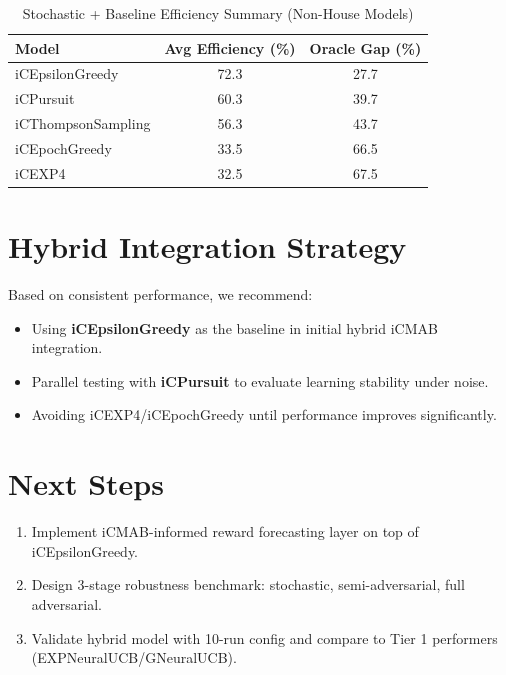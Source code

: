 \documentclass[12pt,a4paper]{article}
\begin{document}
\begin{table}[H]
\centering
\caption{Stochastic + Baseline Efficiency Summary (Non-House Models)}
\begin{tabular}{|l|c|c|}
\hline
\textbf{Model} & \textbf{Avg Efficiency (\%)} & \textbf{Oracle Gap (\%)} \\
\hline
iCEpsilonGreedy & 72.3 & 27.7 \\
iCPursuit & 60.3 & 39.7 \\
iCThompsonSampling & 56.3 & 43.7 \\
iCEpochGreedy & 33.5 & 66.5 \\
iCEXP4 & 32.5 & 67.5 \\
\hline
\end{tabular}
\end{table}

\section*{Hybrid Integration Strategy}
Based on consistent performance, we recommend:
\begin{itemize}
  \item Using \textbf{iCEpsilonGreedy} as the baseline in initial hybrid iCMAB integration.
  \item Parallel testing with \textbf{iCPursuit} to evaluate learning stability under noise.
  \item Avoiding iCEXP4/iCEpochGreedy until performance improves significantly.
\end{itemize}

\section*{Next Steps}
\begin{enumerate}
  \item Implement iCMAB-informed reward forecasting layer on top of iCEpsilonGreedy.
  \item Design 3-stage robustness benchmark: stochastic, semi-adversarial, full adversarial.
  \item Validate hybrid model with 10-run config and compare to Tier 1 performers (EXPNeuralUCB/GNeuralUCB).
\end{enumerate}
\end{document}
